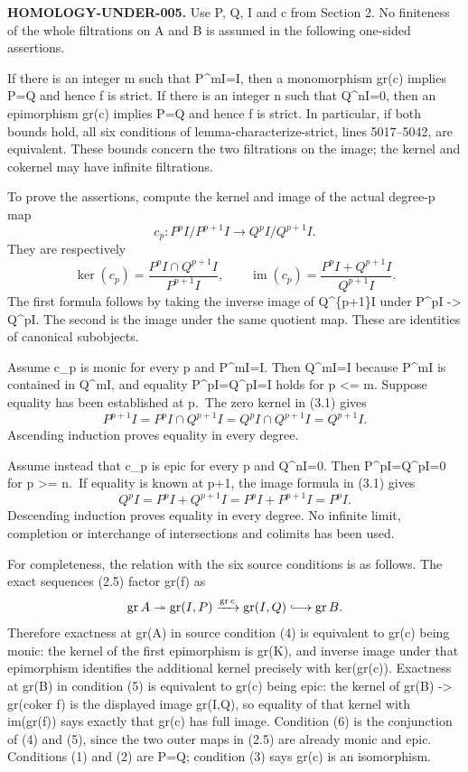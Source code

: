 \textbf{HOMOLOGY-UNDER-005.} Use P, Q, I and c from Section 2. No finiteness of the whole filtrations on A and B is assumed in the following one-sided assertions.

If there is an integer m such that P\^{}mI=I, then a monomorphism gr(c) implies P=Q and hence f is strict. If there is an integer n such that Q\^{}nI=0, then an epimorphism gr(c) implies P=Q and hence f is strict. In particular, if both bounds hold, all six conditions of lemma-characterize-strict, lines 5017--5042, are equivalent. These bounds concern the two filtrations on the image; the kernel and cokernel may have infinite filtrations.

To prove the assertions, compute the kernel and image of the actual degree-p map \[
c_p:P^pI/P^{p+1}I\longrightarrow Q^pI/Q^{p+1}I.
\] They are respectively \[
\ker(c_p)=
\frac{P^pI\cap Q^{p+1}I}{P^{p+1}I},\qquad
\operatorname{im}(c_p)=
\frac{P^pI+Q^{p+1}I}{Q^{p+1}I}.                           \tag{3.1}
\] The first formula follows by taking the inverse image of Q\^{}\{p+1\}I under P\^{}pI -\textgreater{} Q\^{}pI. The second is the image under the same quotient map. These are identities of canonical subobjects.

Assume c\_p is monic for every p and P\^{}mI=I. Then Q\^{}mI=I because P\^{}mI is contained in Q\^{}mI, and equality P\^{}pI=Q\^{}pI=I holds for p \textless= m. Suppose equality has been established at p.~The zero kernel in (3.1) gives \[
P^{p+1}I=P^pI\cap Q^{p+1}I
=Q^pI\cap Q^{p+1}I=Q^{p+1}I.
\] Ascending induction proves equality in every degree.

Assume instead that c\_p is epic for every p and Q\^{}nI=0. Then P\^{}pI=Q\^{}pI=0 for p \textgreater= n.~If equality is known at p+1, the image formula in (3.1) gives \[
Q^pI=P^pI+Q^{p+1}I=P^pI+P^{p+1}I=P^pI.
\] Descending induction proves equality in every degree. No infinite limit, completion or interchange of intersections and colimits has been used.

For completeness, the relation with the six source conditions is as follows. The exact sequences (2.5) factor gr(f) as \[
\operatorname{gr}A
\twoheadrightarrow\operatorname{gr}(I,P)
\xrightarrow{\operatorname{gr}c}\operatorname{gr}(I,Q)
\lhook\joinrel\longrightarrow\operatorname{gr}B.
\] Therefore exactness at gr(A) in source condition (4) is equivalent to gr(c) being monic: the kernel of the first epimorphism is gr(K), and inverse image under that epimorphism identifies the additional kernel precisely with ker(gr(c)). Exactness at gr(B) in condition (5) is equivalent to gr(c) being epic: the kernel of gr(B) -\textgreater{} gr(coker f) is the displayed image gr(I,Q), so equality of that kernel with im(gr(f)) says exactly that gr(c) has full image. Condition (6) is the conjunction of (4) and (5), since the two outer maps in (2.5) are already monic and epic. Conditions (1) and (2) are P=Q; condition (3) says gr(c) is an isomorphism.

